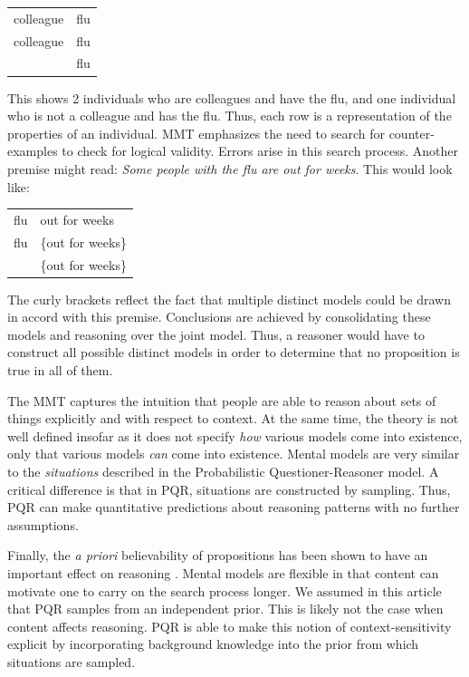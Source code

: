 \documentclass[10pt,letterpaper]{article}
\begin{document}
\begin{tabular}{l l}
colleague & flu\\
colleague & flu\\
 & flu\\
\end{tabular}

This shows 2 individuals who are colleagues and have the flu, and one individual who is not a colleague and has the flu. Thus, each row is a representation of the properties of an individual. MMT emphasizes the need to search for counter-examples to check for logical validity. Errors arise in this search process. Another premise might read: \emph{Some people with the flu are out for weeks}. This would look like:

\begin{tabular}{l l}
flu & out for weeks\\
flu & \{out for weeks\}\\
 & \{out for weeks\}\\
\end{tabular}

The curly brackets reflect the fact that multiple distinct models could be drawn in accord with this premise. Conclusions are achieved by consolidating these models and reasoning over the joint model. Thus, a reasoner would have to construct all possible distinct models in order to determine that no proposition is true in all of them. 

The MMT captures the intuition that people are able to reason about sets of things explicitly and with respect to context. At the same time, the theory is not well defined insofar as it does not specify \emph{how} various models come into existence, only that various models \emph{can} come into existence. Mental models are very similar to the \emph{situations} described in the Probabilistic Questioner-Reasoner model. A critical difference is that in PQR, situations are constructed by sampling. Thus, PQR can make quantitative predictions about reasoning patterns with no further assumptions. 

Finally, the \emph{a priori} believability of propositions has been shown to have an important effect on reasoning \cite{Oakhill1989}. Mental models are flexible in that content can motivate one to carry on the search process longer. We assumed in this article that PQR samples from an independent prior. This is likely not the case when content affects reasoning. PQR is able to make this notion of context-sensitivity explicit by incorporating background knowledge into the prior from which situations are sampled. 
\end{document}
